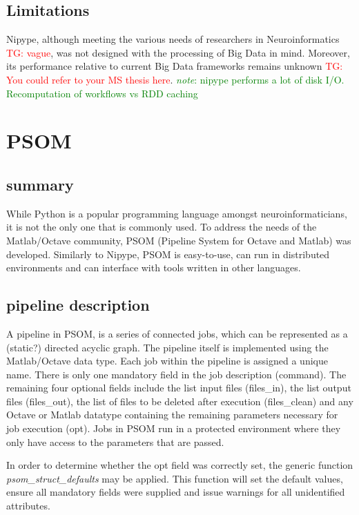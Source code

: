 \documentclass{report}
\newcommand{\note}[1]{\textcolor{green}{\textit{note}: #1}}
\newcommand{\tristan}[1]{\textcolor{red}{TG: #1}}
\begin{document}
		\subsection{Limitations}
		Nipype, although meeting the various needs of
                researchers in Neuroinformatics \tristan{vague}, was
                not designed with the processing of Big Data in
                mind. Moreover, its performance relative to current
                Big Data frameworks remains unknown \tristan{You could
                  refer to your MS thesis here}.  \note{nipype
                  performs a lot of disk I/O. Recomputation of
                  workflows vs RDD caching}
		
    \section{PSOM} 
        \subsection{summary} 
        While Python is a popular programming language amongst
neuroinformaticians, it is not the only one that is commonly used. To address
the needs of the Matlab/Octave community, PSOM (Pipeline System for Octave and
Matlab) was developed. Similarly to Nipype, PSOM is easy-to-use, can run in
distributed environments and can interface with tools written in other
languages.

        \subsection{pipeline description}
        A pipeline in PSOM, is a series of connected jobs, which can be
represented as a (static?) directed acyclic graph. The pipeline itself is implemented 
using the Matlab/Octave data type. Each job within the pipeline
is assigned a unique name. There is only one mandatory field in the job
description (command). The remaining four optional fields include the list input
files (files\_in), the list output files (files\_out), the list of files to be
deleted after execution (files\_clean) and any Octave or Matlab datatype
containing the remaining parameters necessary for job execution (opt).
Jobs in PSOM run in a protected environment where they only have access to the
parameters that are passed. 

        In order to determine whether the opt field was correctly set, the
generic function \textit{psom\_struct\_defaults} may be applied. This function
will set the default values, ensure all mandatory fields were supplied and issue
warnings for all unidentified attributes.
\end{document}
